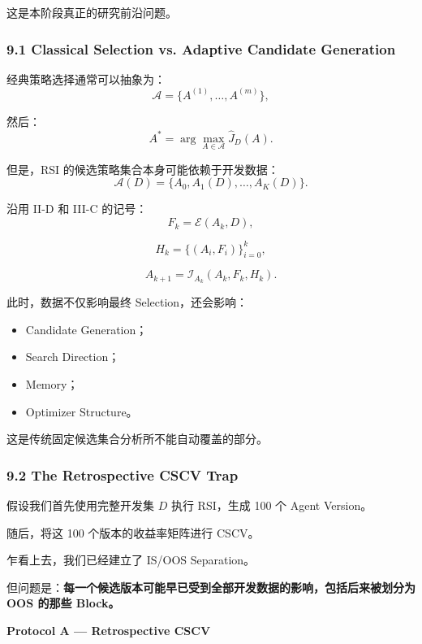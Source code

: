 这是本阶段真正的研究前沿问题。

\hypertarget{part-4-71-0001-classical-selection-vs.-adaptive-candidate-generation}{%
\subsubsection{9.1 Classical Selection vs. Adaptive Candidate Generation}\label{part-4-71-0001-classical-selection-vs.-adaptive-candidate-generation}}

经典策略选择通常可以抽象为：
\[\mathcal A
=
\{A^{(1)},\ldots,A^{(m)}\},\]

然后：
\[A^*
=
\arg\max_{A\in\mathcal A}
\widehat J_D(A).\]

但是，RSI 的候选策略集合本身可能依赖于开发数据：
\[\mathcal A(D)
=
\{A_0,A_1(D),\ldots,A_K(D)\}.\]

沿用 II-D 和 III-C 的记号：
\[F_k=\mathcal E(A_k,D),\]

\[H_k=\{(A_i,F_i)\}_{i=0}^{k},\]

\[A_{k+1}
=
\mathcal I_{A_k}(A_k,F_k,H_k).\]

此时，数据不仅影响最终 Selection，还会影响：

\begin{itemize}
\tightlist
\item
  Candidate Generation；
\item
  Search Direction；
\item
  Memory；
\item
  Optimizer Structure。
\end{itemize}

这是传统固定候选集合分析所不能自动覆盖的部分。

\hypertarget{part-4-71-0001-the-retrospective-cscv-trap}{%
\subsubsection{9.2 The Retrospective CSCV Trap}\label{part-4-71-0001-the-retrospective-cscv-trap}}

假设我们首先使用完整开发集 \(D\) 执行 RSI，生成 100 个 Agent Version。

随后，将这 100 个版本的收益率矩阵进行 CSCV。

乍看上去，我们已经建立了 IS/OOS Separation。

但问题是：\textbf{每一个候选版本可能早已受到全部开发数据的影响，包括后来被划分为 OOS 的那些 Block。}

\textbf{Protocol A --- Retrospective CSCV}



